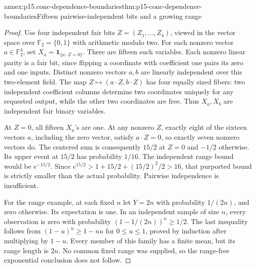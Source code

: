 \begin{annexitem}{annex:p15.conc-dependence-boundaries}{thm:p15-conc-dependence-boundaries}{Fifteen pairwise-independent bits and a growing range}
\begin{proof}
Use four independent fair bits \(Z=(Z_1,\ldots,Z_4)\),
viewed in the vector space over \(\mathbb F_2=\{0,1\}\)
with arithmetic modulo two. For each nonzero vector
\(a\in\mathbb F_2^4\), set \(X_a=\mathbf1_{\{a\cdot Z=0\}}\).
There are fifteen such variables.
Each nonzero linear parity is a fair bit, since
flipping a coordinate with coefficient one pairs its
zero and one inputs.
Distinct nonzero vectors \(a,b\) are linearly independent
over this two-element field. The map
\(Z\mapsto(a\cdot Z,b\cdot Z)\) has four equally sized
fibers: two independent coefficient columns determine
two coordinates uniquely for any requested output,
while the other two coordinates are free.
Thus \(X_a,X_b\) are independent fair binary variables.

At \(Z=0\), all fifteen \(X_a\)'s are one.
At any nonzero \(Z\), exactly eight of the sixteen
vectors \(a\), including the zero vector, satisfy
\(a\cdot Z=0\), so exactly seven nonzero vectors do.
The centered sum is consequently \(15/2\) at \(Z=0\)
and \(-1/2\) otherwise. Its upper event at \(15/2\)
has probability \(1/16\).
The independent range bound would be \(e^{-15/2}\).
Since \(e^{15/2}>1+15/2+(15/2)^2/2>16\), that
purported bound is strictly smaller than the actual
probability. Pairwise independence is insufficient.

For the range example, at each fixed \(n\) let
\(Y=2n\) with probability \(1/(2n)\), and zero otherwise.
Its expectation is one. In an independent sample
of size \(n\), every observation is zero with probability
\((1-1/(2n))^n\geq1/2\). The last inequality follows
from \((1-u)^n\geq1-nu\) for \(0\leq u\leq1\),
proved by induction after multiplying by \(1-u\).
Every member of this family has a finite mean, but
its range length is \(2n\). No common fixed range
was supplied, so the range-free exponential conclusion
does not follow.
\end{proof}
\end{annexitem}

